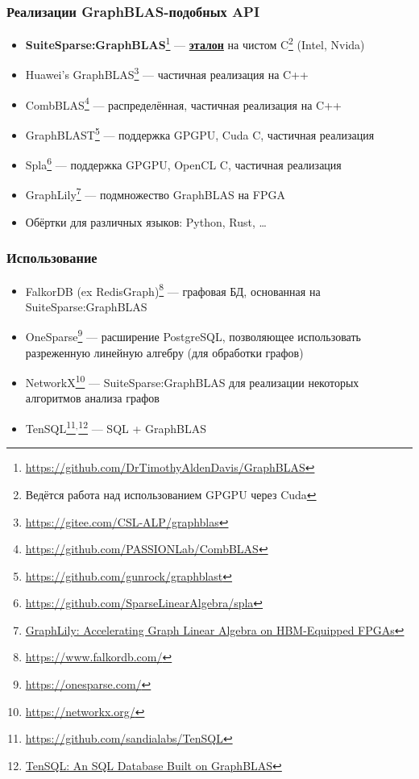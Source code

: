 \documentclass[xcolor=table,aspectratio=169]{beamer}
\begin{document}
\begin{frame}[fragile]
  \frametitle{Реализации GraphBLAS-подобных API}
  \begin{itemize}
      \item \textbf{SuiteSparse:GraphBLAS}\footnote{\url{https://github.com/DrTimothyAldenDavis/GraphBLAS}} --- \underline{\textbf{эталон}} на чистом C\footnote{Ведётся работа над использованием GPGPU через Cuda} (Intel, Nvida)
      \item Huawei's GraphBLAS\footnote{\url{https://gitee.com/CSL-ALP/graphblas}} --- частичная реализация на C++
      \item CombBLAS\footnote{\url{https://github.com/PASSIONLab/CombBLAS}} --- распределённая, частичная реализация на C++
      \item GraphBLAST\footnote{\url{https://github.com/gunrock/graphblast}} --- поддержка GPGPU, Cuda C, частичная реализация
      \item Spla\footnote{\url{https://github.com/SparseLinearAlgebra/spla}} --- поддержка GPGPU, OpenCL C, частичная реализация
      \item GraphLily\footnote{\href{https://dl.acm.org/doi/10.1109/ICCAD51958.2021.9643582}{GraphLily: Accelerating Graph Linear Algebra on HBM-Equipped FPGAs}} --- подмножество GraphBLAS на FPGA
      \item Обёртки для различных языков: Python, Rust, \ldots
  \end{itemize}
\end{frame}

\begin{frame}[fragile]
  \frametitle{Использование}
      \begin{itemize}
        \item FalkorDB (ex RedisGraph)\footnote{\url{https://www.falkordb.com/}} --- графовая БД, основанная на SuiteSparse:GraphBLAS
        \item OneSparse\footnote{\url{https://onesparse.com/}} --- расширение PostgreSQL, позволяющее использовать разреженную линейную алгебру (для обработки графов)
        \item NetworkX\footnote{\url{https://networkx.org/}} --- SuiteSparse:GraphBLAS для реализации некоторых алгоритмов анализа графов
        \item TenSQL\footnote{\url{https://github.com/sandialabs/TenSQL}}$^{,}$\footnote{\href{https://ieeexplore.ieee.org/document/10363601}{TenSQL: An SQL Database Built on GraphBLAS}} --- SQL + GraphBLAS
      \end{itemize}  
\end{frame}
\end{document}
